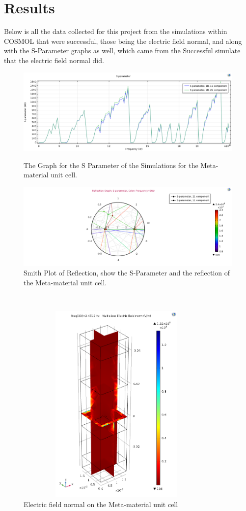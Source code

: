 \documentclass[]{article}
\begin{document}
\section{Results}
Below is all the data collected for this project from the simulations within COSMOL that were successful, those being the electric field normal, and along with the S-Parameter graphs as well, which came from the Successful simulate that the electric field normal did.
\begin{figure}[h!]
	\centering
	\includegraphics[width=\textwidth]{SParameterGraph1D.png}
	\caption{The Graph for the S Parameter of the Simulations for the Meta-material unit cell.}
	\label{fig:mesh1}
	\includegraphics[width=\textwidth]{SmithPlotforReflection.png}
	\caption{Smith Plot of Reflection, show the S-Parameter and the reflection of the Meta-material unit cell.}
	\label{fig:mesh2}
\end{figure}
\\
\begin{figure}[h!]
	\centering
	\includegraphics[width=10cm, height=10cm]{ElectricFieldNormalGraphImage2.png}
	\caption{Electric field normal on the Meta-material unit cell}
	\label{fig:mesh3}
\end{figure}
\end{document}
